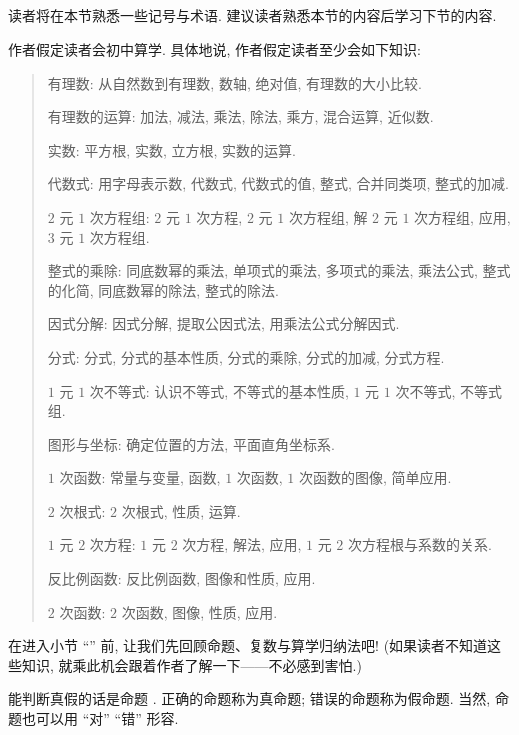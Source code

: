 \subsection*{\Prerequisites}
\markright{\Prerequisites}

读者将在本节熟悉一些记号与术语. 建议读者熟悉本节的内容后学习下节的内容.

作者假定读者会初中算学. 具体地说, 作者假定读者至少会如下知识:
\begin{quotation}
    有理数: 从自然数到有理数, 数轴, 绝对值, 有理数的大小比较.

    有理数的运算: 加法, 减法, 乘法, 除法, 乘方, 混合运算, 近似数.

    实数: 平方根, 实数, 立方根, 实数的运算.

    代数式: 用字母表示数, 代数式, 代数式的值, 整式, 合并同类项, 整式的加减.

    $2$ 元 $1$ 次方程组: $2$ 元 $1$ 次方程, $2$ 元 $1$ 次方程组, 解 $2$ 元 $1$ 次方程组, 应用, $3$ 元 $1$ 次方程组.

    整式的乘除: 同底数幂的乘法, 单项式的乘法, 多项式的乘法, 乘法公式, 整式的化简, 同底数幂的除法, 整式的除法.

    因式分解: 因式分解, 提取公因式法, 用乘法公式分解因式.

    分式: 分式, 分式的基本性质, 分式的乘除, 分式的加减, 分式方程.

    $1$ 元 $1$ 次不等式: 认识不等式, 不等式的基本性质, $1$ 元 $1$ 次不等式, 不等式组.

    图形与坐标: 确定位置的方法, 平面直角坐标系.

    $1$ 次函数: 常量与变量, 函数, $1$ 次函数, $1$ 次函数的图像, 简单应用.

    $2$ 次根式: $2$ 次根式, 性质, 运算.

    $1$ 元 $2$ 次方程: $1$ 元 $2$ 次方程, 解法, 应用, $1$ 元 $2$ 次方程根与系数的关系.

    反比例函数: 反比例函数, 图像和性质, 应用.

    $2$ 次函数: $2$ 次函数, 图像, 性质, 应用.
\end{quotation}

在进入小节 ``\Sets'' 前, 让我们先回顾命题、复数与算学归纳法吧! (如果读者不知道这些知识, 就乘此机会跟着作者了解一下——不必感到害怕.)

\begin{definition}
    能判断真假的话是命题 . 正确的命题称为真命题; 错误的命题称为假命题. 当然, 命题也可以用 ``对'' ``错'' 形容.
\end{definition}

